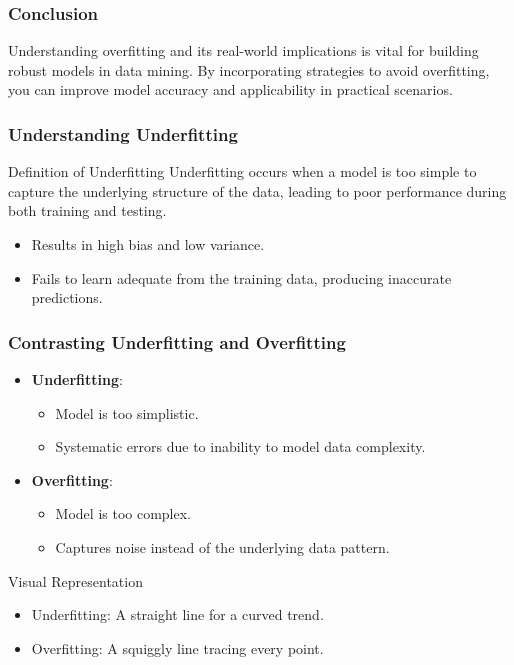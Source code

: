 \documentclass[aspectratio=169]{beamer}
\begin{document}
\begin{frame}[fragile]
    \frametitle{Conclusion}
    Understanding overfitting and its real-world implications is vital for building robust models in data mining. By incorporating strategies to avoid overfitting, you can improve model accuracy and applicability in practical scenarios.
\end{frame}

\begin{frame}[fragile]
    \frametitle{Understanding Underfitting}
    \begin{block}{Definition of Underfitting}
        Underfitting occurs when a model is too simple to capture the underlying structure of the data, leading to poor performance during both training and testing.
    \end{block}
    \begin{itemize}
        \item Results in high bias and low variance.
        \item Fails to learn adequate from the training data, producing inaccurate predictions.
    \end{itemize}
\end{frame}

\begin{frame}[fragile]
    \frametitle{Contrasting Underfitting and Overfitting}
    \begin{itemize}
        \item \textbf{Underfitting}:
        \begin{itemize}
            \item Model is too simplistic.
            \item Systematic errors due to inability to model data complexity.
        \end{itemize}
        
        \item \textbf{Overfitting}:
        \begin{itemize}
            \item Model is too complex.
            \item Captures noise instead of the underlying data pattern.
        \end{itemize}
    \end{itemize}
    
    \begin{block}{Visual Representation}
        \begin{itemize}
            \item Underfitting: A straight line for a curved trend.
            \item Overfitting: A squiggly line tracing every point.
        \end{itemize}
    \end{block}
\end{frame}
\end{document}
